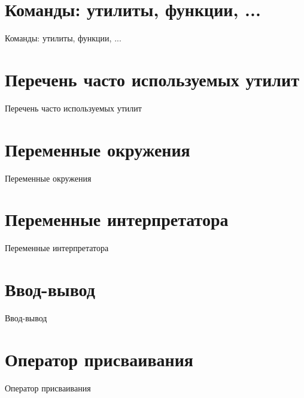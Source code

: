 \documentclass[hyperref={unicode=true}]{beamer}
\begin{document}
\newcommand{\iframe}[1]{
\section{#1}\begin{frame}[fragile]{#1}\par\vspace{-1em}
}
\newcommand{\pframe}[1]{
\begin{frame}[fragile]{#1}\par\vspace{-1em}
}


\iframe{Команды: утилиты, функции, ...}
\end{frame}

\iframe{Перечень часто используемых утилит}
\end{frame}

\iframe{Переменные окружения}
\end{frame}

\iframe{Переменные интерпретатора}
\end{frame}

\iframe{Ввод-вывод}
\end{frame}

\iframe{Оператор присваивания}
\end{frame}
\end{document}
